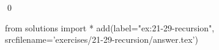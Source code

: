 
\begin{ex}
  \label{ex:21-29-recursion}
  
  \qed
\end{ex}
\begin{python0}
from solutions import *
add(label="ex:21-29-recursion",
    srcfilename='exercises/21-29-recursion/answer.tex')
\end{python0}
